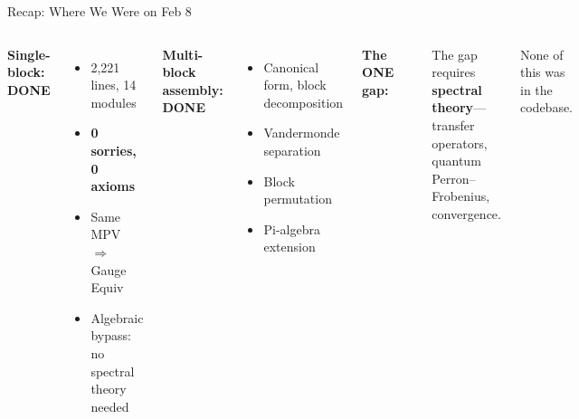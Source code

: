 \documentclass[aspectratio=169,10pt]{beamer}
\begin{document}
\begin{frame}{Recap: Where We Were on Feb 8}
\vspace{-0.3em}
\begin{columns}[T]
\textbf{\textcolor{leangreen}{Single-block: DONE}}
\begin{itemize}\itemsep0.1em
  \item {\small 2,221 lines, 14 modules}
  \item {\small \textbf{0 sorries, 0 axioms}}
  \item {\small Same MPV $\Rightarrow$ Gauge Equiv}
  \item {\small Algebraic bypass: no spectral theory needed}
\end{itemize}

\vspace{0.5em}
\textbf{\textcolor{leangreen}{Multi-block assembly: DONE}}
\begin{itemize}\itemsep0.1em
  \item {\small Canonical form, block decomposition}
  \item {\small Vandermonde separation}
  \item {\small Block permutation}
  \item {\small Pi-algebra extension}
\end{itemize}

\textbf{\textcolor{softred}{The ONE gap:}}
\begin{center}
\end{center}

\vspace{0.3em}
{\small The gap requires \textbf{spectral theory}---transfer operators, quantum Perron--Frobenius, convergence.}

\vspace{0.2em}
{\small \textcolor{amber}{None of this was in the codebase.}}
\end{columns}
\end{frame}
\end{document}
